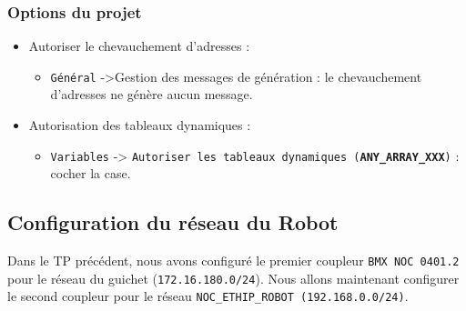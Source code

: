 \subsubsection{Options du projet}
\begin{UPSTIConfiguration}
    \begin{itemize}
        \item Autoriser le chevauchement d'adresses : 
        \begin{itemize}
            \item \texttt{Général} ->Gestion des messages de génération : le chevauchement d’adresses ne génère
            aucun message.
        \end{itemize}
        \item Autorisation des tableaux dynamiques : 
        \begin{itemize}
            \item \texttt{Variables} -> \texttt{Autoriser les tableaux dynamiques (\textbf{ANY\_ARRAY\_XXX})} : cocher la case.
            \end{itemize}
    \end{itemize}
\end{UPSTIConfiguration}



\subsection{Configuration du réseau du Robot}

Dans le TP précédent, nous avons configuré le premier coupleur \texttt{BMX NOC 0401.2} pour le réseau du guichet (\texttt{172.16.180.0/24}). Nous allons maintenant configurer le second coupleur pour le réseau \texttt{NOC\_ETHIP\_ROBOT (192.168.0.0/24)}.

